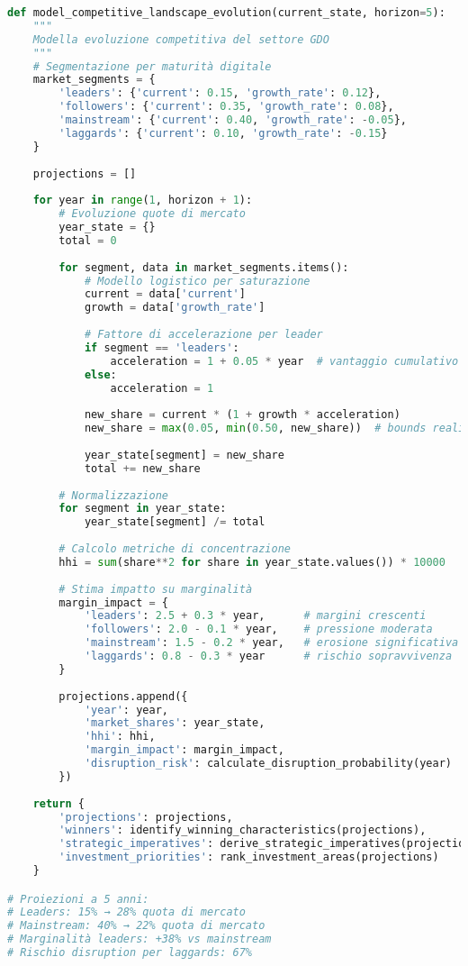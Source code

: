 \begin{lstlisting}[language=Python, caption=Modello evoluzione competitiva GDO]
def model_competitive_landscape_evolution(current_state, horizon=5):
    """
    Modella evoluzione competitiva del settore GDO
    """
    # Segmentazione per maturità digitale
    market_segments = {
        'leaders': {'current': 0.15, 'growth_rate': 0.12},
        'followers': {'current': 0.35, 'growth_rate': 0.08},
        'mainstream': {'current': 0.40, 'growth_rate': -0.05},
        'laggards': {'current': 0.10, 'growth_rate': -0.15}
    }
    
    projections = []
    
    for year in range(1, horizon + 1):
        # Evoluzione quote di mercato
        year_state = {}
        total = 0
        
        for segment, data in market_segments.items():
            # Modello logistico per saturazione
            current = data['current']
            growth = data['growth_rate']
            
            # Fattore di accelerazione per leader
            if segment == 'leaders':
                acceleration = 1 + 0.05 * year  # vantaggio cumulativo
            else:
                acceleration = 1
                
            new_share = current * (1 + growth * acceleration)
            new_share = max(0.05, min(0.50, new_share))  # bounds realistici
            
            year_state[segment] = new_share
            total += new_share
            
        # Normalizzazione
        for segment in year_state:
            year_state[segment] /= total
            
        # Calcolo metriche di concentrazione
        hhi = sum(share**2 for share in year_state.values()) * 10000
        
        # Stima impatto su marginalità
        margin_impact = {
            'leaders': 2.5 + 0.3 * year,      # margini crescenti
            'followers': 2.0 - 0.1 * year,    # pressione moderata
            'mainstream': 1.5 - 0.2 * year,   # erosione significativa
            'laggards': 0.8 - 0.3 * year      # rischio sopravvivenza
        }
        
        projections.append({
            'year': year,
            'market_shares': year_state,
            'hhi': hhi,
            'margin_impact': margin_impact,
            'disruption_risk': calculate_disruption_probability(year)
        })
        
    return {
        'projections': projections,
        'winners': identify_winning_characteristics(projections),
        'strategic_imperatives': derive_strategic_imperatives(projections),
        'investment_priorities': rank_investment_areas(projections)
    }

# Proiezioni a 5 anni:
# Leaders: 15% → 28% quota di mercato
# Mainstream: 40% → 22% quota di mercato  
# Marginalità leaders: +38% vs mainstream
# Rischio disruption per laggards: 67%
\end{lstlisting}

